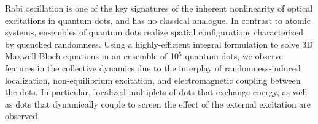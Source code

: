 Rabi oscillation is one of the key signatures of the inherent nonlinearity of optical excitations in quantum dots, and has no classical analogue. In contrast to atomic systems, ensembles of quantum dots realize spatial configurations characterized by quenched randomness. Using a highly-efficient integral formulation to solve 3D Maxwell-Bloch equations in an ensemble of 10$^5$ quantum dots, we observe features in the collective dynamics due to the interplay of  randomness-induced localization, non-equilibrium excitation, and electromagnetic coupling between the dots. In particular, localized multiplets of dots that exchange energy, as well as dots that dynamically couple to screen the effect of the external excitation are observed.
